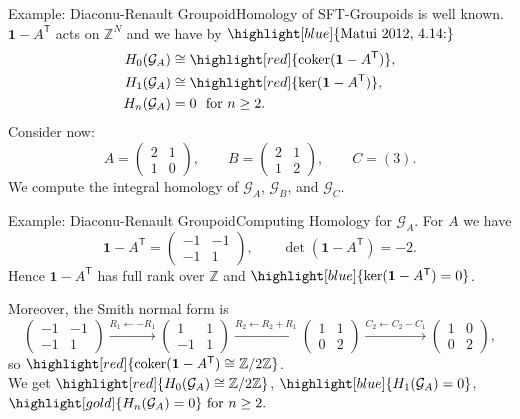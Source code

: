 \documentclass[aspectratio=169]{beamer}
\newcommand{\G}{\mathcal{G}}
\begin{document}
\begin{frame}{Example: Diaconu-Renault Groupoid}{Homology of SFT-Groupoids is well known.}
  \(\mathbf{1}-A^{\mathsf T}\) acts on \(\mathbb Z^N\) and we have by $\highlight[blue]{\text{Matui 2012, 4.14:}}$
  \[
    \begin{aligned}
      H_0(\mathcal G_A) &\cong \highlight[red]{\operatorname{coker}(\mathbf{1}-A^{\mathsf T})},\\
      H_1(\mathcal G_A) &\cong \highlight[red]{\ker(\mathbf{1}-A^{\mathsf T})},\\
      H_n(\mathcal G_A) &= 0\ \ \text{for}\ n\ge 2.
    \end{aligned}
  \]
  Consider now:
  \[
    A=\begin{pmatrix}2&1\\[2pt]1&0\end{pmatrix},\qquad
    B=\begin{pmatrix}2&1\\[2pt]1&2\end{pmatrix},\qquad
    C=(3).
  \]
  We compute the integral homology of \(\mathcal G_A\), \(\mathcal G_B\), and \(\mathcal G_C\).
\end{frame}

\begin{frame}{Example: Diaconu-Renault Groupoid}{Computing Homology for $\G_A$.}
  For \(A\) we have
  \[
    \mathbf{1}-A^{\mathsf T}=
    \begin{pmatrix}-1&-1\\[2pt]-1&1\end{pmatrix},
    \qquad
    \det(\mathbf{1}-A^{\mathsf T})=-2.
  \]
  Hence \(\mathbf{1}-A^{\mathsf T}\) has full rank over \(\mathbb Z\) and \(\highlight[blue]{\ker(\mathbf{1}-A^{\mathsf T})=0}\).

  Moreover, the Smith normal form is
  \[
    \begin{pmatrix}
      -1 & -1\\
      -1 &  1
    \end{pmatrix}
    \overset{R_1\leftarrow - R_1}{\longrightarrow}
    \begin{pmatrix}
      1 & 1\\
      -1 & 1
    \end{pmatrix}
    \overset{R_2\leftarrow R_2+R_1}{\longrightarrow}
    \begin{pmatrix}
      1 & 1\\
      0 & 2
    \end{pmatrix}
    \overset{C_2\leftarrow C_2- C_1}{\longrightarrow}
    \begin{pmatrix}
      1 & 0\\
      0 & 2
    \end{pmatrix},
  \]
  so \(\highlight[red]{\operatorname{coker}(\mathbf{1}-A^{\mathsf T})\cong \mathbb Z/2\mathbb Z}\).\\[0.2cm]
  We get \(\highlight[red]{H_0(\mathcal G_A) \cong \mathbb Z/2\mathbb Z}\), \(\highlight[blue]{H_1(\mathcal G_A) = 0}\), \(\highlight[gold]{H_n(\mathcal G_A) = 0} \ \text{for}\ n\ge 2.\)
\end{frame}
\end{document}
